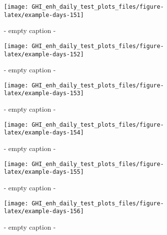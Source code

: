 \documentclass[
  10pt,
  a4paper,oneside]{article}
\begin{document}
\begin{figure}[H]

{\centering \texttt{[image: GHI\_enh\_daily\_test\_plots\_files/figure-latex/example-days-151]} 

}

\caption{ - empty caption - }\label{fig:example-days-151}
\end{figure}

\begin{figure}[H]

{\centering \texttt{[image: GHI\_enh\_daily\_test\_plots\_files/figure-latex/example-days-152]} 

}

\caption{ - empty caption - }\label{fig:example-days-152}
\end{figure}

\begin{figure}[H]

{\centering \texttt{[image: GHI\_enh\_daily\_test\_plots\_files/figure-latex/example-days-153]} 

}

\caption{ - empty caption - }\label{fig:example-days-153}
\end{figure}

\begin{figure}[H]

{\centering \texttt{[image: GHI\_enh\_daily\_test\_plots\_files/figure-latex/example-days-154]} 

}

\caption{ - empty caption - }\label{fig:example-days-154}
\end{figure}

\begin{figure}[H]

{\centering \texttt{[image: GHI\_enh\_daily\_test\_plots\_files/figure-latex/example-days-155]} 

}

\caption{ - empty caption - }\label{fig:example-days-155}
\end{figure}

\begin{figure}[H]

{\centering \texttt{[image: GHI\_enh\_daily\_test\_plots\_files/figure-latex/example-days-156]} 

}

\caption{ - empty caption - }\label{fig:example-days-156}
\end{figure}
\end{document}
